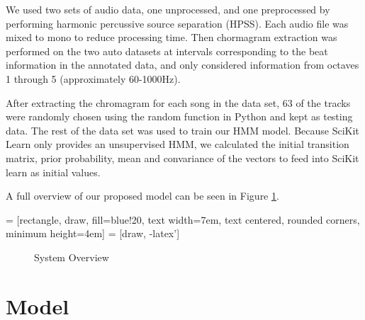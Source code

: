 \documentclass{article}
\begin{document}
We used two sets of audio data, one unprocessed, and one preprocessed by
performing harmonic percussive source separation (HPSS). Each audio file was mixed
to mono to reduce processing time. Then chormagram extraction was
performed on the two auto datasets at intervals corresponding to the beat information in the 
annotated data, and only considered information from octaves 1 through 5 (approximately 60-1000Hz).

After extracting the chromagram for each song in the data set, 63 of the tracks were randomly
chosen using the random function in Python and kept as testing data. The rest of the data set
was used to train our HMM model. Because SciKit Learn only provides an unsupervised HMM, we calculated the initial transition matrix, prior probability, mean and convariance of the 
vectors to feed into SciKit learn as initial values.

A full overview of our proposed model can be seen in Figure \ref{fig:overview}.

 = [rectangle, draw, fill=blue!20,
    text width=7em, text centered, rounded corners, minimum height=4em]
 = [draw, -latex']

\begin{figure}
\caption{System Overview}
\label{fig:overview}
\end{figure}

\section{Model}
\end{document}
